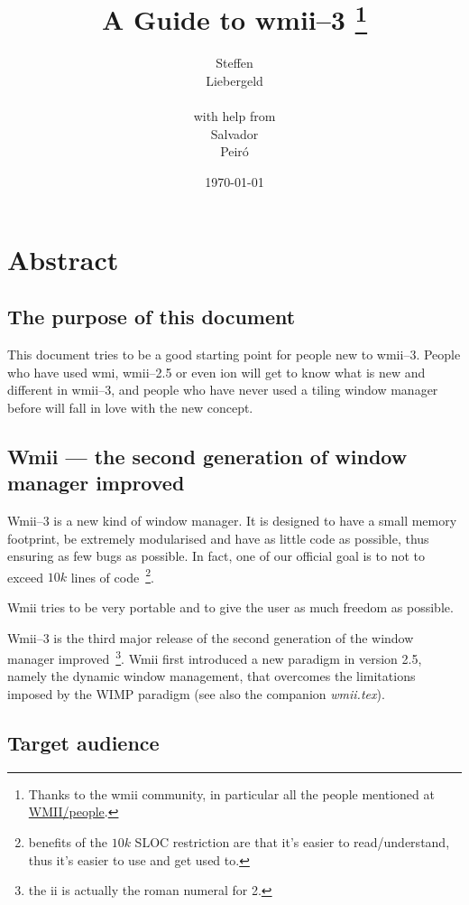 \documentclass[12pt,a4paper]{article} %
\date{\today}
\author{
Steffen\\Liebergeld \\\\
\small{with help from}\\
Salvador\\Peir\'o
}
\title{A Guide to wmii--3%
\thanks{Thanks to the wmii community, in particular all the 
people mentioned at \href{http://wmii.de/index.php/WMII/People}{WMII/people}.}
}
\begin{document}
\maketitle

\tableofcontents

\newpage

\section{Abstract}

  \subsection{The purpose of this document}

    This document tries to be a good starting point for people new to
    wmii--3.  People who have used wmi, wmii--2.5 or even ion will get
    to know what is new and different in wmii--3, and people who have
    never used a tiling window manager before will fall in love with
    the new concept.
  
  \subsection{Wmii --- the second generation of window manager improved}

    Wmii--3 is a new kind of window manager. It is designed to have a
    small memory footprint, be extremely modularised and have as
    little code as possible, thus ensuring as few bugs as possible. In
    fact, one of our official goal is to not to exceed $10 k$ lines of
    code~\footnote{ benefits of the $10 k$ SLOC restriction are that
    it's easier to read/understand, thus it's easier to use and get
    used to.}.

    Wmii tries to be very portable and to give the user as much
    freedom as possible.

    Wmii--3 is the third major release of the second generation of the
    window manager improved~\footnote{ the ii is actually the roman
    numeral for 2.}.  Wmii first introduced a new paradigm in version
    2.5, namely the dynamic window management, that overcomes the
    limitations imposed by the WIMP paradigm (see also the companion
    \emph{wmii.tex}).
  
  \subsection{Target audience}
\end{document}
